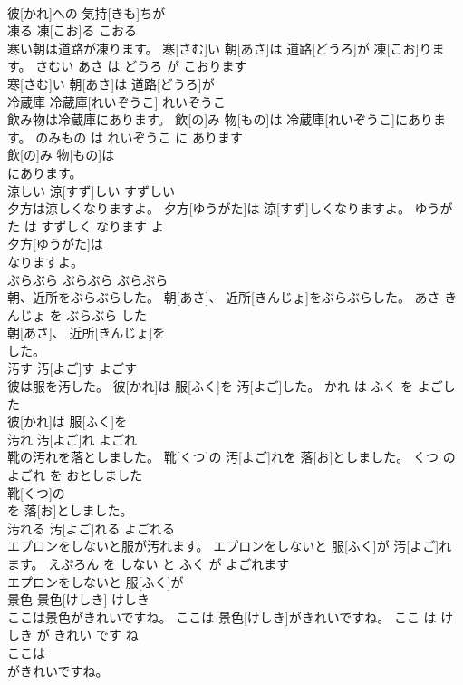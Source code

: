 \documentclass[8pt]{extreport}
\begin{document}
\begin{CJK}{UTF8}{min}
\\	彼[かれ]への 気持[きも]ちが
\\	凍る	凍[こお]る	こおる	
\\	寒い朝は道路が凍ります。	寒[さむ]い 朝[あさ]は 道路[どうろ]が 凍[こお]ります。	さむい あさ は どうろ が こおります	
\\	寒[さむ]い 朝[あさ]は 道路[どうろ]が
\\	冷蔵庫	冷蔵庫[れいぞうこ]	れいぞうこ	
\\	飲み物は冷蔵庫にあります。	飲[の]み 物[もの]は 冷蔵庫[れいぞうこ]にあります。	のみもの は れいぞうこ に あります	
\\	飲[の]み 物[もの]は
\\	にあります。			
\\	涼しい	涼[すず]しい	すずしい	
\\	夕方は涼しくなりますよ。	夕方[ゆうがた]は 涼[すず]しくなりますよ。	ゆうがた は すずしく なります よ	
\\	夕方[ゆうがた]は
\\	なりますよ。			
\\	ぶらぶら	ぶらぶら	ぶらぶら	
\\	朝、近所をぶらぶらした。	朝[あさ]、 近所[きんじょ]をぶらぶらした。	あさ きんじょ を ぶらぶら した	
\\	朝[あさ]、 近所[きんじょ]を
\\	した。			
\\	汚す	汚[よご]す	よごす	
\\	彼は服を汚した。	彼[かれ]は 服[ふく]を 汚[よご]した。	かれ は ふく を よごした	
\\	彼[かれ]は 服[ふく]を
\\	汚れ	汚[よご]れ	よごれ	
\\	靴の汚れを落としました。	靴[くつ]の 汚[よご]れを 落[お]としました。	くつ の よごれ を おとしました	
\\	靴[くつ]の
\\	を 落[お]としました。			
\\	汚れる	汚[よご]れる	よごれる	
\\	エプロンをしないと服が汚れます。	エプロンをしないと 服[ふく]が 汚[よご]れます。	えぷろん を しない と ふく が よごれます	
\\	エプロンをしないと 服[ふく]が
\\	景色	景色[けしき]	けしき	
\\	ここは景色がきれいですね。	ここは 景色[けしき]がきれいですね。	ここ は けしき が きれい です ね	
\\	ここは
\\	がきれいですね。			

\end{CJK}
\end{document}

